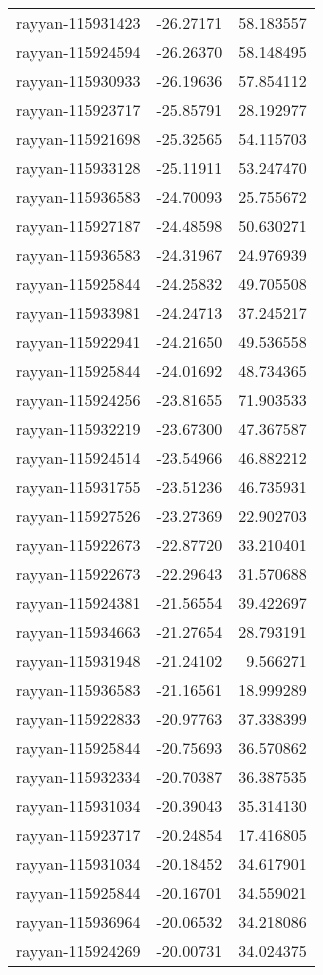 \documentclass[
]{article}
\begin{document}
\begin{longtable}[]{@{}lrr@{}}
rayyan-115931423 & -26.27171 & 58.183557 \\
rayyan-115924594 & -26.26370 & 58.148495 \\
rayyan-115930933 & -26.19636 & 57.854112 \\
rayyan-115923717 & -25.85791 & 28.192977 \\
rayyan-115921698 & -25.32565 & 54.115703 \\
rayyan-115933128 & -25.11911 & 53.247470 \\
rayyan-115936583 & -24.70093 & 25.755672 \\
rayyan-115927187 & -24.48598 & 50.630271 \\
rayyan-115936583 & -24.31967 & 24.976939 \\
rayyan-115925844 & -24.25832 & 49.705508 \\
rayyan-115933981 & -24.24713 & 37.245217 \\
rayyan-115922941 & -24.21650 & 49.536558 \\
rayyan-115925844 & -24.01692 & 48.734365 \\
rayyan-115924256 & -23.81655 & 71.903533 \\
rayyan-115932219 & -23.67300 & 47.367587 \\
rayyan-115924514 & -23.54966 & 46.882212 \\
rayyan-115931755 & -23.51236 & 46.735931 \\
rayyan-115927526 & -23.27369 & 22.902703 \\
rayyan-115922673 & -22.87720 & 33.210401 \\
rayyan-115922673 & -22.29643 & 31.570688 \\
rayyan-115924381 & -21.56554 & 39.422697 \\
rayyan-115934663 & -21.27654 & 28.793191 \\
rayyan-115931948 & -21.24102 & 9.566271 \\
rayyan-115936583 & -21.16561 & 18.999289 \\
rayyan-115922833 & -20.97763 & 37.338399 \\
rayyan-115925844 & -20.75693 & 36.570862 \\
rayyan-115932334 & -20.70387 & 36.387535 \\
rayyan-115931034 & -20.39043 & 35.314130 \\
rayyan-115923717 & -20.24854 & 17.416805 \\
rayyan-115931034 & -20.18452 & 34.617901 \\
rayyan-115925844 & -20.16701 & 34.559021 \\
rayyan-115936964 & -20.06532 & 34.218086 \\
rayyan-115924269 & -20.00731 & 34.024375 \\
\bottomrule()
\end{longtable}
\end{document}
